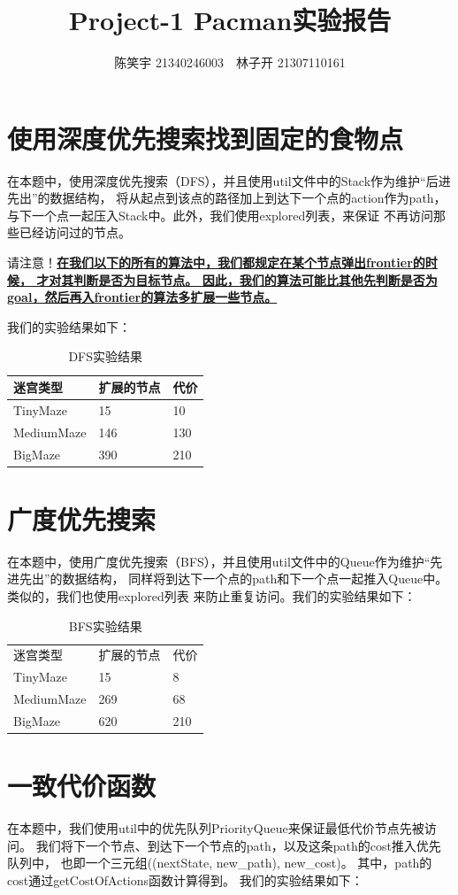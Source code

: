 \documentclass{article}
\title{Project-1 Pacman实验报告}
\author{陈笑宇 21340246003$\quad$林子开 21307110161}
\date{}
\begin{document}
	\maketitle
	\tableofcontents

\section{使⽤深度优先搜索找到固定的食物点}
在本题中，使用深度优先搜索（DFS），并且使用util文件中的Stack作为维护“后进先出”的数据结构，
将从起点到该点的路径加上到达下一个点的action作为path，
与下一个点一起压入Stack中。此外，我们使用explored列表，来保证
不再访问那些已经访问过的节点。

请注意！\underline{\textbf{在我们以下的所有的算法中，我们都规定在某个节点弹出frontier的时候，
才对其判断是否为目标节点。
因此，我们的算法可能比其他先判断是否为goal，然后再入frontier的算法多扩展一些节点。}}

我们的实验结果如下：

\begin{table}[H]
	\centering
	\caption{DFS实验结果}
	\begin{tabular}{lll}
	\hline
	迷宫类型       & 扩展的节点 & 代价  \\
	\hline
	TinyMaze   & 15    & 10  \\
	MediumMaze & 146   & 130 \\
	BigMaze    & 390   & 210\\
	\hline
	\end{tabular}
	\end{table}

\section{广度优先搜索}
在本题中，使用广度优先搜索（BFS），并且使用util文件中的Queue作为维护“先进先出”的数据结构，
同样将到达下一个点的path和下一个点一起推入Queue中。类似的，我们也使用explored列表
来防止重复访问。我们的实验结果如下：
\begin{table}[H]
	\centering
	\caption{BFS实验结果}
	\begin{tabular}{lll}
	迷宫类型       & 扩展的节点 & 代价  \\
	TinyMaze   & 15    & 8   \\
	MediumMaze & 269   & 68  \\
	BigMaze    & 620   & 210
	\end{tabular}
	\end{table}


\section{一致代价函数}
在本题中，我们使用util中的优先队列PriorityQueue来保证最低代价节点先被访问。
我们将下一个节点、到达下一个节点的path，以及这条path的cost推入优先队列中，
也即一个三元组((nextState, new_path), new_cost)。
其中，path的cost通过getCostOfActions函数计算得到。
我们的实验结果如下：
\end{document}
